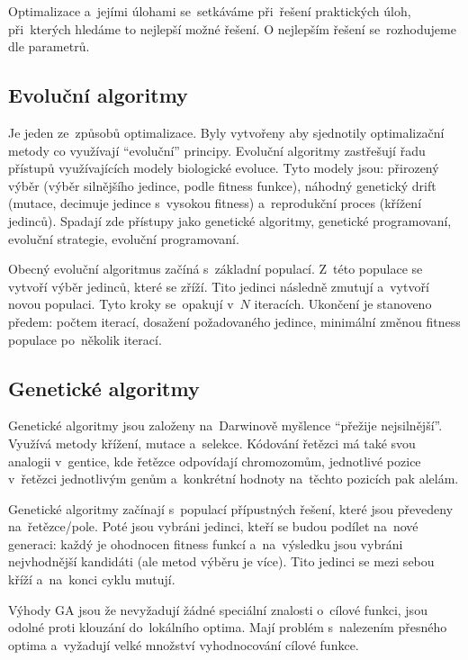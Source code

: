 Optimalizace a~jejími úlohami se~setkáváme při~řešení praktických úloh, při~kterých hledáme to nejlepší možné řešení. O nejlepším řešení se~rozhodujeme dle parametrů.

\subsection{Evoluční algoritmy}

Je jeden ze~způsobů optimalizace. Byly vytvořeny aby sjednotily optimalizační metody co využívají \enquote{evoluční} principy. Evoluční algoritmy zastřešují řadu přístupů využívajících modely biologické evoluce. Tyto modely jsou: přirozený výběr (výběr silnějšího jedince, podle fitness funkce), náhodný genetický drift (mutace, decimuje jedince s~vysokou fitness) a~reprodukční proces (křížení jedinců). Spadají zde přístupy jako genetické algoritmy, genetické programovaní, evoluční strategie, evoluční programovaní.

Obecný evoluční algoritmus začíná s~základní populací. Z~této populace se vytvoří výběr jedinců, které se zříží. Tito jedinci následně zmutují a~vytvoří novou populaci. Tyto kroky se~opakují v~$N$ iteracích. Ukončení je stanoveno předem: počtem iterací, dosažení požadovaného jedince, minimální změnou fitness populace po~několik iterací.

\subsection{Genetické algoritmy}

Genetické algoritmy jsou založeny na~Darwinově myšlence \enquote{přežije nejsilnější}. Využívá metody křížení, mutace a~selekce. Kódování řetězci má také svou analogii v~gentice, kde řetězce odpovídají chromozomům, jednotlivé pozice v~řetězci jednotlivým genům a~konkrétní hodnoty na~těchto pozicích pak alelám.

Genetické algoritmy začínají s~populací přípustných řešení, které jsou převedeny na~řetězce/pole. Poté jsou vybráni jedinci, kteří se budou podílet na~nové generaci: každý je ohodnocen fitness funkcí a~na~výsledku jsou vybráni nejvhodnější kandidáti (ale metod výběru je více). Tito jedinci se mezi sebou kříží a~na~konci cyklu mutují.

Výhody GA jsou že nevyžadují žádné speciální znalosti o~cílové funkci, jsou odolné proti klouzání do~lokálního optima. Mají problém s~nalezením přesného optima a~vyžadují velké množství vyhodnocování cílové funkce.

